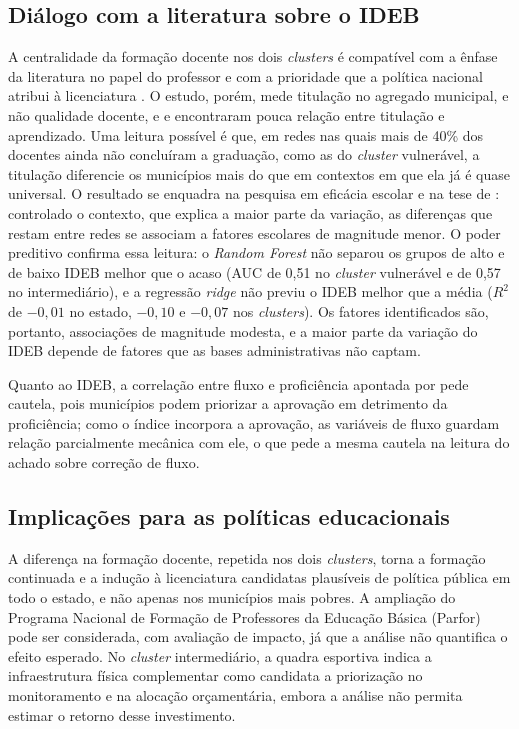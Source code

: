 \subsection{Diálogo com a literatura sobre o IDEB}

A centralidade da formação docente nos dois \textit{clusters} é compatível com a ênfase da literatura no papel do professor e com a prioridade que a política nacional atribui à licenciatura \parencite{brasil2014, gatti2019}. O estudo, porém, mede titulação no agregado municipal, e não qualidade docente, e \textcite{rivkin2005} e \textcite{glewwe2013} encontraram pouca relação entre titulação e aprendizado. Uma leitura possível é que, em redes nas quais mais de 40\% dos docentes ainda não concluíram a graduação, como as do \textit{cluster} vulnerável, a titulação diferencie os municípios mais do que em contextos em que ela já é quase universal. O resultado se enquadra na pesquisa em eficácia escolar \parencite{brooke2008} e na tese de \textcite{coleman1966}: controlado o contexto, que explica a maior parte da variação, as diferenças que restam entre redes se associam a fatores escolares de magnitude menor. O poder preditivo confirma essa leitura: o \textit{Random Forest} não separou os grupos de alto e de baixo IDEB melhor que o acaso (AUC de 0,51 no \textit{cluster} vulnerável e de 0,57 no intermediário), e a regressão \textit{ridge} não previu o IDEB melhor que a média ($R^2$ de $-0{,}01$ no estado, $-0{,}10$ e $-0{,}07$ nos \textit{clusters}). Os fatores identificados são, portanto, associações de magnitude modesta, e a maior parte da variação do IDEB depende de fatores que as bases administrativas não captam.

Quanto ao IDEB, a correlação entre fluxo e proficiência apontada por \textcite{soares2013} pede cautela, pois municípios podem priorizar a aprovação em detrimento da proficiência; como o índice incorpora a aprovação, as variáveis de fluxo guardam relação parcialmente mecânica com ele, o que pede a mesma cautela na leitura do achado sobre correção de fluxo.

\subsection{Implicações para as políticas educacionais}

A diferença na formação docente, repetida nos dois \textit{clusters}, torna a formação continuada e a indução à licenciatura candidatas plausíveis de política pública em todo o estado, e não apenas nos municípios mais pobres. A ampliação do Programa Nacional de Formação de Professores da Educação Básica (Parfor) pode ser considerada, com avaliação de impacto, já que a análise não quantifica o efeito esperado. No \textit{cluster} intermediário, a quadra esportiva indica a infraestrutura física complementar como candidata a priorização no monitoramento e na alocação orçamentária, embora a análise não permita estimar o retorno desse investimento.
